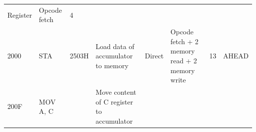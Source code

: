 \documentclass[11pt,twocolumn]{article}
\begin{document}
\begin{longtable}[]{@{}llllllll@{}}
\begin{minipage}[t]{0.09\columnwidth}
Register\strut
\end{minipage} & \begin{minipage}[t]{0.25\columnwidth}\raggedright
Opcode fetch\strut
\end{minipage} & \begin{minipage}[t]{0.05\columnwidth}\raggedright
4\strut
\end{minipage} & \begin{minipage}[t]{0.03\columnwidth}\raggedright
\strut
\end{minipage}\tabularnewline
\begin{minipage}[t]{0.04\columnwidth}\raggedright
2000\strut
\end{minipage} & \begin{minipage}[t]{0.05\columnwidth}\raggedright
STA\strut
\end{minipage} & \begin{minipage}[t]{0.05\columnwidth}\raggedright
2503H\strut
\end{minipage} & \begin{minipage}[t]{0.23\columnwidth}\raggedright
Load data of accumulator to memory\strut
\end{minipage} & \begin{minipage}[t]{0.09\columnwidth}\raggedright
Direct\strut
\end{minipage} & \begin{minipage}[t]{0.25\columnwidth}\raggedright
Opcode fetch + 2 memory read + 2 memory write\strut
\end{minipage} & \begin{minipage}[t]{0.05\columnwidth}\raggedright
13\strut
\end{minipage} & \begin{minipage}[t]{0.03\columnwidth}\raggedright
AHEAD\strut
\end{minipage}\tabularnewline
\begin{minipage}[t]{0.04\columnwidth}\raggedright
200F\strut
\end{minipage} & \begin{minipage}[t]{0.05\columnwidth}\raggedright
MOV A, C\strut
\end{minipage} & \begin{minipage}[t]{0.05\columnwidth}\raggedright
\strut
\end{minipage} & \begin{minipage}[t]{0.23\columnwidth}\raggedright
Move content of C register to accumulator\strut
\end{minipage} & \begin{minipage}[t]{0.09\columnwidth}\raggedright

\end{minipage}
\end{longtable}
\end{document}
